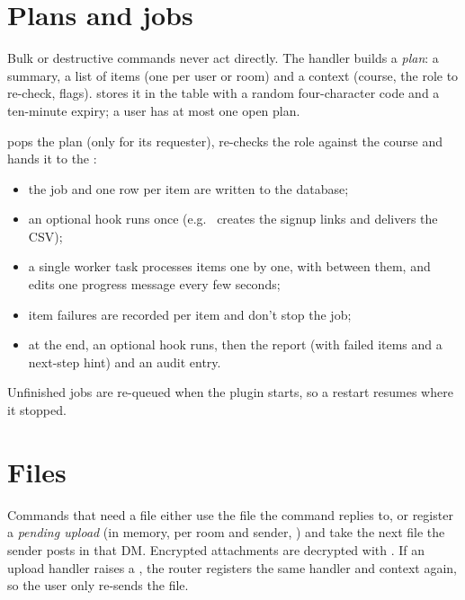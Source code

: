 \section{Plans and jobs}

Bulk or destructive commands never act directly. The handler builds a \emph{plan}: a
summary, a list of items (one per user or room) and a context (course, the role to
re-check, flags).  stores it in the  table with a
random four-character code and a ten-minute expiry; a user has at most one open plan.

 pops the plan (only for its requester), re-checks the role against
the course and hands it to the :

\begin{itemize}
  \item the job and one  row per item are written to the database;
  \item an optional  hook runs once (e.g.\  creates the signup
        links and delivers the CSV);
  \item a single worker task processes items one by one, with 
        between them, and edits one progress message every few seconds;
  \item item failures are recorded per item and don't stop the job;
  \item at the end, an optional  hook runs, then the report (with failed
        items and a next-step hint) and an audit entry.
\end{itemize}

Unfinished jobs are re-queued when the plugin starts, so a restart resumes where it stopped.

\section{Files}

Commands that need a file either use the file the command replies to, or register a
\emph{pending upload} (in memory, per room and sender, ) and take
the next file the sender posts in that DM. Encrypted attachments are decrypted with
. If an upload handler raises a , the
router registers the same handler and context again, so the user only re-sends the file.
